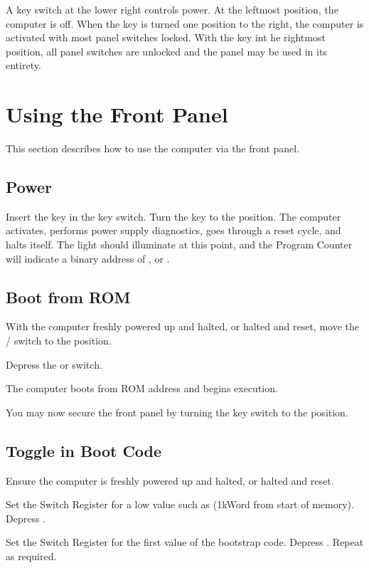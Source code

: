 A key switch at the lower right controls power. At the leftmost position, the
computer is off. When the key is turned one position to the right, the computer
is activated with most panel switches locked. With the key int he rightmost
position, all panel switches are unlocked and the panel may be used in its
entirety.

\section{Using the Front Panel}

This section describes how to use the computer via the front panel.

\subsection{Power}

Insert the key in the key switch. Turn the key to the 
position. The computer activates, performs power supply diagnostics,
goes through a reset cycle, and halts itself. The  light
should illuminate at this point, and the Program Counter will indicate
a binary address of , or .

\subsection{Boot from ROM}

With the computer freshly powered up and halted, or halted and reset,
move the / switch to the 
position.

Depress the  or  switch.

The computer boots from ROM address  and begins execution.

You may now secure the front panel by turning the key switch to the
 position.

\subsection{Toggle in Boot Code}

Ensure the computer is freshly powered up and halted, or halted and reset.

Set the Switch Register for a low value such as 
(1kWord from start of memory). Depress .

Set the Switch Register for the first value of the bootstrap
code. Depress . Repeat as required.

